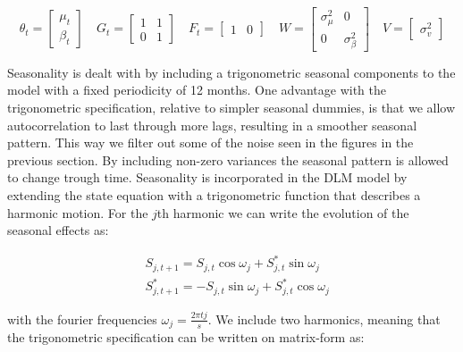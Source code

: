 \documentclass[12pt, a4paper]{article}
\begin{document}
\begin{equation*}
\theta_{t} = \begin{bmatrix} \mu_{t} \\ \beta_{t} \end{bmatrix} \quad 
G_{t} = \begin{bmatrix} 1 & 1 \\ 0 & 1 \end{bmatrix} \quad 
F_{t} = \begin{bmatrix} 1 & 0 \end{bmatrix} \quad
W = \begin{bmatrix} \sigma_{\mu}^{2} & 0 \\ 0 & \sigma_{\beta}^{2} \end{bmatrix} \quad
V = \begin{bmatrix} \sigma_{v}^{2} \end{bmatrix}
\end{equation*}

Seasonality is dealt with by including a trigonometric seasonal
components to the model with a fixed periodicity of 12 months. One
advantage with the trigonometric specification, relative to simpler
seasonal dummies, is that we allow autocorrelation to last through more
lags, resulting in a smoother seasonal pattern. This way we filter out
some of the noise seen in the figures in the previous section. By
including non-zero variances the seasonal pattern is allowed to change
trough time. Seasonality is incorporated in the DLM model by extending
the state equation with a trigonometric function that describes a harmonic motion. For the $j$th harmonic we can write the evolution of the seasonal effects as:


\begin{align}
&S_{j, t+1} = S_{j, t} \cos \omega_{j} + S_{j, t}^{*} \sin \omega_{j} \\ 
&S_{j, t+1}^{*} = - S_{j, t} \sin \omega_{j} + S_{j, t}^{*} \cos \omega_{j}
\end{align}

with the fourier frequencies $\omega_{j} = \frac{2 \pi t j}{s}$. We include two harmonics, meaning that the trigonometric specification can be written on
matrix-form as:
\end{document}
